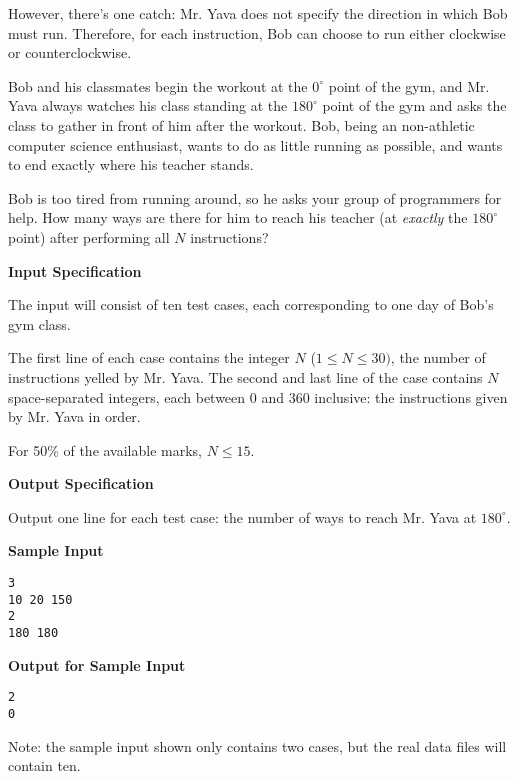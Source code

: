 \documentclass[11pt]{article}
\newcommand{\heading}[1]{\vspace{0.6em} \textbf{#1}}
\begin{document}
However, there's one catch: Mr. Yava does not specify the direction in which Bob must run. Therefore, for each instruction, Bob can choose to run either clockwise or counterclockwise.

Bob and his classmates begin the workout at the $0^{\circ}$ point of the gym, and Mr. Yava always watches his class standing at the $180^{\circ}$ point of the gym and asks the class to gather in front of him after the workout. Bob, being an non-athletic computer science enthusiast, wants to do as little running as possible, and wants to end exactly where his teacher stands.

Bob is too tired from running around, so he asks your group of programmers for help. How many ways are there for him to reach his teacher (at \textit{exactly} the $180^{\circ}$ point) after performing all $N$ instructions?


\heading{Input Specification}

The input will consist of ten test cases, each corresponding to one day of Bob's gym class.

The first line of each case contains the integer $N$ ($1 \le N \le 30)$, the number of instructions yelled by Mr. Yava. The second and last line of the case contains $N$ space-separated integers, each between 0 and 360 inclusive: the instructions given by Mr. Yava in order.

For 50\% of the available marks, $N \le 15$.


\heading{Output Specification}

Output one line for each test case: the number of ways to reach Mr. Yava at $180^{\circ}$.


\heading{Sample Input}
\vspace{-\topsep}
\begin{verbatim}
3
10 20 150
2
180 180
\end{verbatim}

\vspace{-\topsep}
\heading{Output for Sample Input}
\vspace{-\topsep}
\begin{verbatim}
2
0
\end{verbatim}

Note: the sample input shown only contains two cases, but the real data files will contain ten.

\end{document}
